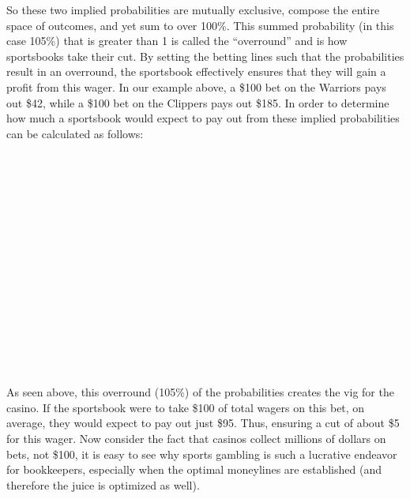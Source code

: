 \documentclass [MS] {uclathes}
\begin{document}
\noindent So these two implied probabilities are mutually exclusive, compose the entire space of outcomes, and yet sum to over 100\%. This summed probability (in this case 105\%) that is greater than 1 is called the ``overround'' and is how sportsbooks take their cut. By setting the betting lines such that the probabilities result in an overround, the sportsbook effectively ensures that they will gain a profit from this wager. In our example above, a \$100 bet on the Warriors pays out \$42, while a \$100 bet on the Clippers pays out \$185. In order to determine how much a sportsbook would expect to pay out from these implied probabilities can be calculated as follows:

\noindent {} \\
\noindent {} \\
\noindent {} \\
\noindent {} \\
\noindent {} \\
\noindent {} \\

\noindent {} \\
\noindent {} \\
\noindent {} \\
\noindent {} \\
\noindent {} \\
\noindent {} \\
\noindent {} \\
\noindent {} \\
\noindent {} \\


\noindent As seen above, this overround (105\%) of the probabilities creates the vig for the casino. If the sportsbook were to take \$100 of total wagers on this bet, on average, they would expect to pay out just \$95. Thus, ensuring a cut of about \$5 for this wager. Now consider the fact that casinos collect millions of dollars on bets, not \$100, it is easy to see why sports gambling is such a lucrative endeavor for bookkeepers, especially when the optimal moneylines are established (and therefore the juice is optimized as well). \\
\end{document}
